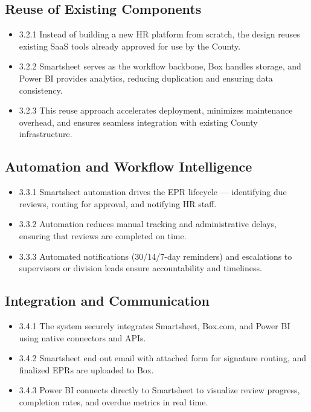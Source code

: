 \documentclass[12pt]{article}
\def\textbf#1{#1}%
\begin{document}
\subsection{Reuse of Existing Components}
\begin{itemize}
  \item \textbf{3.2.1} Instead of building a new HR platform from scratch, the design reuses existing SaaS tools already approved for use by the County.
  \item \textbf{3.2.2} Smartsheet serves as the workflow backbone, Box handles storage, and Power BI provides analytics, reducing duplication and ensuring data consistency.
  \item \textbf{3.2.3} This reuse approach accelerates deployment, minimizes maintenance overhead, and ensures seamless integration with existing County infrastructure.
\end{itemize}

\subsection{Automation and Workflow Intelligence}
\begin{itemize}
  \item \textbf{3.3.1} Smartsheet automation drives the EPR lifecycle — identifying due reviews, routing for approval, and notifying HR staff.
  \item \textbf{3.3.2} Automation reduces manual tracking and administrative delays, ensuring that reviews are completed on time.
  \item \textbf{3.3.3} Automated notifications (30/14/7-day reminders) and escalations to supervisors or division leads ensure accountability and timeliness.
\end{itemize}

\subsection{Integration and Communication}
\begin{itemize}
  \item \textbf{3.4.1} The system securely integrates Smartsheet, Box.com, and Power BI using native connectors and APIs.
  \item \textbf{3.4.2} Smartsheet end out email with attached form for signature routing, and finalized EPRs are uploaded to Box.
  \item \textbf{3.4.3} Power BI connects directly to Smartsheet to visualize review progress, completion rates, and overdue metrics in real time.
\end{itemize}
\end{document}
